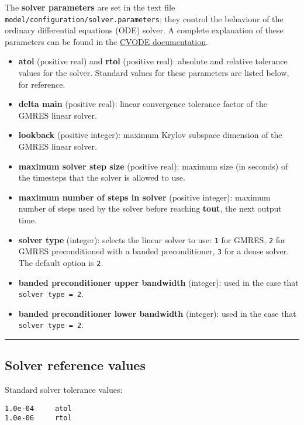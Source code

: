 The \textbf{solver parameters} are set in the text file
\texttt{model/configuration/solver.parameters}; they control the
behaviour of the ordinary differential equations (ODE) solver. A
complete explanation of these parameters can be found in the
\href{https://computation.llnl.gov/projects/sundials/sundials-software}{CVODE
documentation}.

\begin{itemize}
\item
  \textbf{atol} (positive real) and \textbf{rtol} (positive real):
  absolute and relative tolerance values for the solver. Standard values
  for these parameters are listed below, for reference.
\item
  \textbf{delta main} (positive real): linear convergence tolerance
  factor of the GMRES linear solver.
\item
  \textbf{lookback} (positive integer): maximum Krylov subspace
  dimension of the GMRES linear solver.
\item
  \textbf{maximum solver step size} (positive real): maximum size (in
  seconds) of the timesteps that the solver is allowed to use.
\item
  \textbf{maximum number of steps in solver} (positive integer): maximum
  number of steps used by the solver before reaching \textbf{tout}, the
  next output time.
\item
  \textbf{solver type} (integer): selects the linear solver to use:
  \texttt{1} for GMRES, \texttt{2} for GMRES preconditioned with a
  banded preconditioner, \texttt{3} for a dense solver. The default
  option is \texttt{2}.
\item
  \textbf{banded preconditioner upper bandwidth} (integer): used in the
  case that \texttt{solver\ type\ =\ 2}.
\item
  \textbf{banded preconditioner lower bandwidth} (integer): used in the
  case that \texttt{solver\ type\ =\ 2}.
\end{itemize}

\begin{center}\rule{0.5\linewidth}{\linethickness}\end{center}

\hypertarget{solver-reference-values}{%
\subsection{Solver reference values}\label{solver-reference-values}}

Standard solver tolerance values:

\begin{verbatim}
1.0e-04     atol
1.0e-06     rtol
\end{verbatim}
